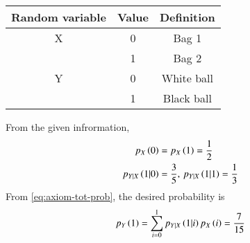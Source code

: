 \begin{table}[H]
	\centering
\begin{tabular}{|c|c|c|}
\hline
Random variable &Value &Definition\\ \hline
 X &0 & Bag 1\\
 &1 & Bag 2\\
\hline
 Y &0 & White ball\\
 &1 & Black ball\\
\hline
\end{tabular}
\caption{}
\label{tab:exemplar/12/13/3/17}
\end{table}
From the given infrormation,
\begin{align}
	p_{X}\left(0\right) &= 
p_{X}\left(1\right) = \frac{1}{2}
\\
p_{Y|X}\left(1|0\right) &= \frac{3}{5},\,
p_{Y|X}\left(1|1\right) = \frac{1}{3}
\end{align}
From \eqref{eq:axiom-tot-prob},
the desired probability is 
\begin{align}
\begin{split}
p_{Y}\left(1\right) = \sum_{i=0}^{1}p_{Y|X}\left( 1| i\right)  p_{X}\left(i\right)
         = \frac{7}{15}
\end{split}         
\end{align}

